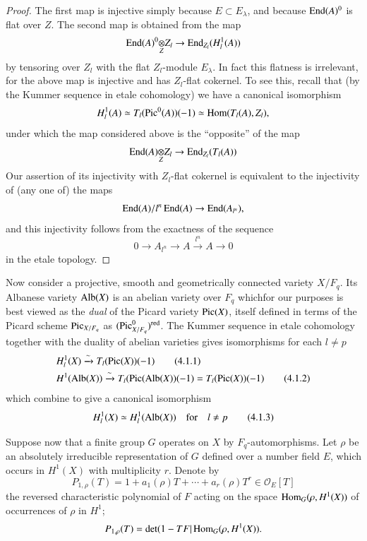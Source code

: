 \begin{proof}
The first map is injective simply because $E\subset E_{\lambda}$, and because $\operatorname{End}(A)^{0}$ is flat over $Z$. The second map is obtained from the map
$$
\foprod{\End(A)^{0}}{Z_{l}}{Z}\to \End_{Z_{l}}(H^{1}_{l}(A))
$$
by tensoring over $Z_{l}$ with the flat $Z_{l}$-module $E_{\lambda}$. In fact this flatness is irrelevant, for the above map is injective and has $Z_{l}$-flat cokernel. To see this, recall that (by the Kummer sequence in etale cohomology) we have a canonical isomorphism
$$
H^{1}_{l}(A)\simeq T_{l}(\operatorname{Pic}^{0}(A))(-1)\simeq \operatorname{Hom}(T_{l}(A),Z_{l}),
$$
under which the map considered above is the ``opposite'' of the map
$$
\foprod{\End(A)}{Z_{l}}{Z}\to \End_{Z_{l}}(T_{l}(A))
$$
Our assertion of its injectivity with $Z_{l}$-flat cokernel is equivalent to the injectivity of (any one of) the maps
$$
\operatorname{End}(A)/l^{n}\operatorname{End}(A)\to \operatorname{End}(A_{l^{n}}),
$$
and this injectivity follows from the exactness of the sequence
$$
0\to A_{l^{n}}\to A \xrightarrow{l^{n}} A\to 0
$$
in the etale topology.
\end{proof}

Now consider a projective, smooth and geometrically connected variety $X/F_{q}$. Its Albanese variety $\operatorname{Alb}(X)$ is an abelian variety over $F_{q}$ which\pageoriginale for our purposes is best viewed as the {\em dual} of the Picard variety $\operatorname{Pic}(X)$, itself defined in terms of the Picard scheme $\operatorname{Pic}_{X/F_{q}}$ as $(\operatorname{Pic}^{0}_{X/F_{q}})^{\operatorname{red}}$. The Kummer sequence in etale cohomology together with the duality of abelian varieties gives isomorphisms for each $l\neq p$
\begin{align*}
& H^{1}_{l}(X)\xrightarrow{\sim}T_{l}(\operatorname{Pic}(X))(-1)\tag{4.1.1}\label{art6-eq4.1.1}\\
& H^{1}(\operatorname{Alb}(X))\xrightarrow{\sim}T_{l}(\operatorname{Pic}(\operatorname{Alb}(X))(-1)=T_{l}(\operatorname{Pic}(X))(-1)\tag{4.1.2}\label{art6-eq4.1.2}
\end{align*}
which combine to give a canonical isomorphism
\begin{equation*}
H^{1}_{l}(X)\simeq H^{1}_{l}(\operatorname{Alb}(X))\quad\text{for}\quad l\neq p\tag{4.1.3}\label{art6-eq4.1.3}
\end{equation*}

Suppose now that a finite group $G$ operates on $X$ by $F_{q}$-automorphisms. Let $\rho$ be an absolutely irreducible representation of $G$ defined over a number field $E$, which occurs in $H^{1}(X)$ with multiplicity $r$. Denote by
$$
P_{1,\rho}(T)=1+a_{1}(\rho)T+\cdots+a_{r}(\rho)T^{r}\in \mathscr{O}_{E}[T]
$$
the reversed characteristic polynomial of $F$ acting on the space $\operatorname{Hom}_{G}(\rho,H^{1}(X))$ of occurrences of $\rho$ in $H^{1}$;
$$
P_{1,\rho}(T)=\det (1-TF|\operatorname{Hom}_{G}(\rho,H^{1}(X)).
$$

